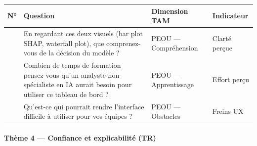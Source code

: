\documentclass[
  12pt,
]{article}
\newcounter{none} %
\begin{document}
{\def\LTcaptype{none} %
\begin{longtable}[]{@{}
  >{\raggedright\arraybackslash}p{}
  >{\raggedright\arraybackslash}p{}
  >{\raggedright\arraybackslash}p{}
  >{\raggedright\arraybackslash}p{}@{}}
\toprule\noalign{}
\begin{minipage}[b]{\linewidth}\raggedright
N°
\end{minipage} & \begin{minipage}[b]{\linewidth}\raggedright
Question
\end{minipage} & \begin{minipage}[b]{\linewidth}\raggedright
Dimension TAM
\end{minipage} & \begin{minipage}[b]{\linewidth}\raggedright
Indicateur
\end{minipage} \\
\midrule\noalign{}
\endhead
\bottomrule\noalign{}
\endlastfoot
7 & En regardant ces deux visuels (bar plot SHAP, waterfall plot), que
comprenez-vous de la décision du modèle ? & PEOU — Compréhension &
Clarté perçue \\
8 & Combien de temps de formation pensez-vous qu’un analyste
non-spécialiste en IA aurait besoin pour utiliser ce tableau de bord ? &
PEOU — Apprentissage & Effort perçu \\
9 & Qu’est-ce qui pourrait rendre l’interface difficile à utiliser pour
vos équipes ? & PEOU — Obstacles & Freins UX \\
\end{longtable}
}

\paragraph{Thème 4 — Confiance et explicabilité
(TR)}\label{thuxe8me-4-confiance-et-explicabilituxe9-tr}
\end{document}
